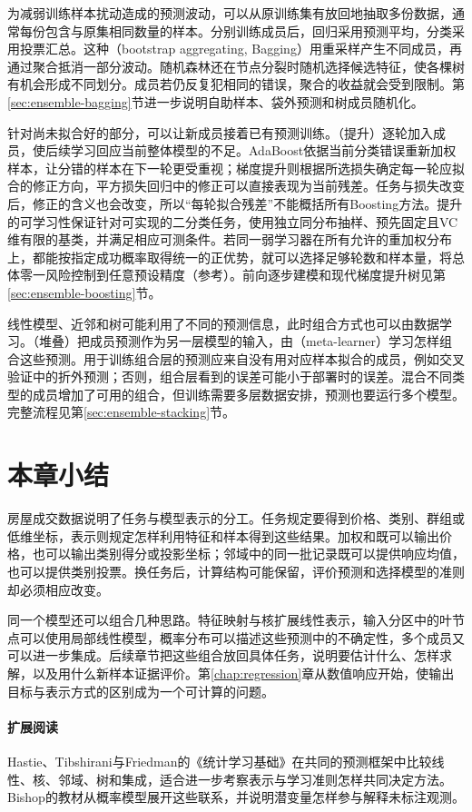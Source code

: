 为减弱训练样本扰动造成的预测波动，可以从原训练集有放回地抽取多份数据，通常每份包含与原集相同数量的样本。分别训练成员后，回归采用预测平均，分类采用投票汇总。这种（bootstrap aggregating, Bagging）用重采样产生不同成员，再通过聚合抵消一部分波动。随机森林还在节点分裂时随机选择候选特征，使各棵树有机会形成不同划分。成员若仍反复犯相同的错误，聚合的收益就会受到限制。第\ref{sec:ensemble-bagging}节进一步说明自助样本、袋外预测和树成员随机化。

针对尚未拟合好的部分，可以让新成员接着已有预测训练。（提升）逐轮加入成员，使后续学习回应当前整体模型的不足。AdaBoost依据当前分类错误重新加权样本，让分错的样本在下一轮更受重视；梯度提升则根据所选损失确定每一轮应拟合的修正方向，平方损失回归中的修正可以直接表现为当前残差。任务与损失改变后，修正的含义也会改变，所以“每轮拟合残差”不能概括所有Boosting方法。提升的可学习性保证针对可实现的二分类任务，使用独立同分布抽样、预先固定且VC维有限的基类，并满足相应可测条件。若同一弱学习器在所有允许的重加权分布上，都能按指定成功概率取得统一的正优势，就可以选择足够轮数和样本量，将总体零一风险控制到任意预设精度（参考）。前向逐步建模和现代梯度提升树见第\ref{sec:ensemble-boosting}节。

线性模型、近邻和树可能利用了不同的预测信息，此时组合方式也可以由数据学习。（堆叠）把成员预测作为另一层模型的输入，由（meta-learner）学习怎样组合这些预测。用于训练组合层的预测应来自没有用对应样本拟合的成员，例如交叉验证中的折外预测；否则，组合层看到的误差可能小于部署时的误差。混合不同类型的成员增加了可用的组合，但训练需要多层数据安排，预测也要运行多个模型。完整流程见第\ref{sec:ensemble-stacking}节。

\section{本章小结}
\label{sec:classic-overview-summary}

房屋成交数据说明了任务与模型表示的分工。任务规定要得到价格、类别、群组或低维坐标，表示则规定怎样利用特征和样本得到这些结果。加权和既可以输出价格，也可以输出类别得分或投影坐标；邻域中的同一批记录既可以提供响应均值，也可以提供类别投票。换任务后，计算结构可能保留，评价预测和选择模型的准则却必须相应改变。

同一个模型还可以组合几种思路。特征映射与核扩展线性表示，输入分区中的叶节点可以使用局部线性模型，概率分布可以描述这些预测中的不确定性，多个成员又可以进一步集成。后续章节把这些组合放回具体任务，说明要估计什么、怎样求解，以及用什么新样本证据评价。第\ref{chap:regression}章从数值响应开始，使输出目标与表示方式的区别成为一个可计算的问题。

\paragraph{扩展阅读}
Hastie、Tibshirani与Friedman的《统计学习基础》在共同的预测框架中比较线性、核、邻域、树和集成，适合进一步考察表示与学习准则怎样共同决定方法。Bishop的教材从概率模型展开这些联系，并说明潜变量怎样参与解释未标注观测。
